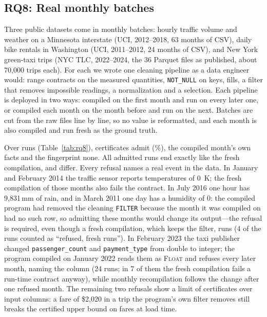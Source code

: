 \documentclass[conference]{IEEEtran}
\begin{document}
\subsection{RQ8: Real monthly batches}

Three public datasets come in monthly batches: hourly traffic volume and weather on a Minnesota
interstate (UCI, 2012--2018, 63 months of CSV), daily bike rentals in Washington (UCI, 2011--2012,
24 months of CSV), and New York green-taxi trips (NYC TLC, 2022--2024, the 36 Parquet files as
published, about 70,000 trips each). For each we wrote one cleaning pipeline as a data engineer
would: range contracts on the measured quantities, \texttt{NOT\_NULL} on keys, fills, a filter that
removes impossible readings, a normalization and a selection. Each pipeline is deployed in two ways:
compiled on the first month and run on every later one, or compiled each month on the month before
and run on the next. Batches are cut from the raw files line by line, so no value is reformatted, and
each month is also compiled and run fresh as the ground truth.



Over \RealRuns{} runs (Table~\ref{tab:rq8}), certificates admit \RealAdmit{} (\RealAdmitPct\%), the
compiled month's own facts \RealFacts{} and the fingerprint none. All \RealAgree{} admitted runs end
exactly like the fresh compilation, and \RealUnsound{} differ. Every refusal names a real event in
the data. In January and February 2014 the traffic sensor reports temperatures of 0~K; the fresh
compilation of those months also fails the contract. In July 2016 one hour has 9,831\,mm of rain,
and in March 2011 one day has a humidity of 0: the compiled program had removed the cleaning
\texttt{FILTER} because the month it was compiled on had no such row, so admitting these months would
change its output---the refusal is required, even though a fresh compilation, which keeps the
filter, runs (4 of the \RealNeedless{} runs counted as ``refused, fresh runs''). In February 2023 the
taxi publisher changed \texttt{passenger\_count} and \texttt{payment\_type} from double to integer;
the program compiled on January 2022 reads them as \textsc{Float} and refuses every later month,
naming the column (24 runs; in 7 of them the fresh compilation fails a run-time contract anyway),
while monthly recompilation follows the change after one refused month. The remaining two refusals
show a limit of certificates over input columns: a fare of \$2,020 in a trip the program's own filter
removes still breaks the certified upper bound on fares at load time.
\end{document}
